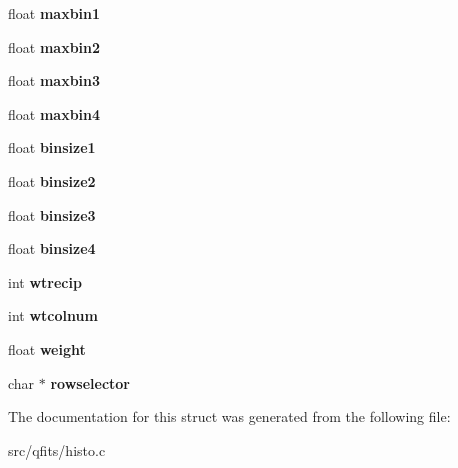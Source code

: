 \begin{DoxyCompactItemize}
float {\bfseries maxbin1}
\item 
\mbox{\label{structhist_type_a0a1916e8bfbbae8198f1b7ce11414006}} 
float {\bfseries maxbin2}
\item 
\mbox{\label{structhist_type_a64f5edc6837d32ec592341fc9090d437}} 
float {\bfseries maxbin3}
\item 
\mbox{\label{structhist_type_a8870d84ad06a35ba7c651b6dfa1d86ab}} 
float {\bfseries maxbin4}
\item 
\mbox{\label{structhist_type_acf2868008ddf4c3f419473c3b540524a}} 
float {\bfseries binsize1}
\item 
\mbox{\label{structhist_type_ac773b9bc489e505057b76565cdfd4193}} 
float {\bfseries binsize2}
\item 
\mbox{\label{structhist_type_a9506267692f0e74e36e068d3799595fa}} 
float {\bfseries binsize3}
\item 
\mbox{\label{structhist_type_a9abf45025456815bdc1aa4fbb5d1352c}} 
float {\bfseries binsize4}
\item 
\mbox{\label{structhist_type_aa37ed39a283684f7ba12cff0787580d0}} 
int {\bfseries wtrecip}
\item 
\mbox{\label{structhist_type_aeeed396fd89e83f71097c0df11cf2641}} 
int {\bfseries wtcolnum}
\item 
\mbox{\label{structhist_type_aa2b6c4b41291f3ba0fdf2317ccaca8b1}} 
float {\bfseries weight}
\item 
\mbox{\label{structhist_type_aa73dbd09e5c36d9b9828e691710bb841}} 
char $\ast$ {\bfseries rowselector}
\end{DoxyCompactItemize}


The documentation for this struct was generated from the following file\+:\begin{DoxyCompactItemize}
\item 
src/qfits/histo.\+c\end{DoxyCompactItemize}
